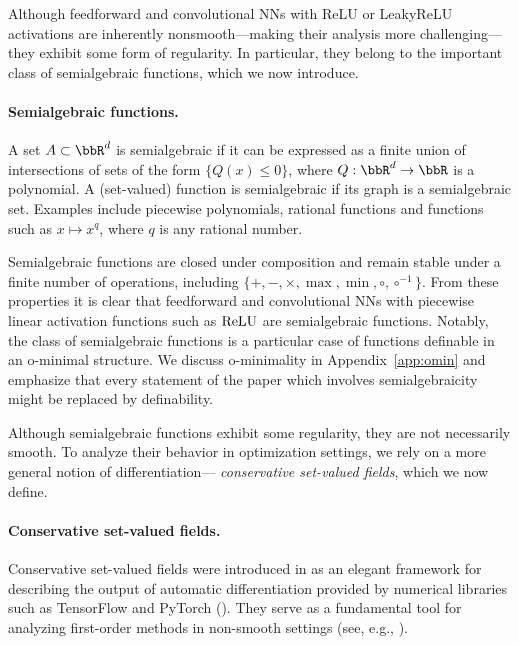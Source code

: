 \label{sec:cons_field}


Although feedforward and convolutional NNs with ReLU or LeakyReLU activations are inherently nonsmooth—making their analysis more challenging—they exhibit some form of regularity. In particular, they belong to the important class of semialgebraic functions, which we now introduce.


\paragraph{Semialgebraic functions.}
A set $A \subset \bbR^d$ is semialgebraic if it can be expressed as a finite union of intersections of sets of the form $\{ Q(x) \leq 0\}$, where $Q : \bbR^d \rightarrow \bbR$ is a polynomial. A (set-valued) function is semialgebraic if its graph is a semialgebraic set. Examples include piecewise polynomials, rational functions and functions such as $x \mapsto x^{q}$, where $q$ is any rational number.

Semialgebraic functions are closed under composition and remain stable under a finite number of operations, including  $\{+, -, \times, \max, \min, \circ, \circ^{-1}\}$. From these properties it is clear that feedforward and convolutional NNs with piecewise linear activation functions such as $\operatorname{ReLU}$ are semialgebraic functions.  Notably, the class of semialgebraic functions is a particular case of functions definable in an o-minimal structure. We discuss o-minimality in Appendix~\ref{app:omin} and emphasize that every statement of the paper which involves semialgebraicity might be replaced by definability.

Although semialgebraic functions exhibit some regularity, they are not necessarily smooth. To analyze their behavior in optimization settings, we rely on a more general notion of differentiation--- \emph{conservative set-valued fields}, which we now define.


\paragraph{Conservative set-valued fields.}
Conservative set-valued fields were introduced in \cite{bolte2021conservative} as an elegant framework for describing the output of automatic differentiation provided by numerical libraries such as TensorFlow and PyTorch (\cite{tensorflow2015-whitepaper,paszke2017automatic}). 
They serve as a fundamental tool for analyzing first-order methods in non-smooth settings (see, e.g., \cite{bolte2023subgradient}).

